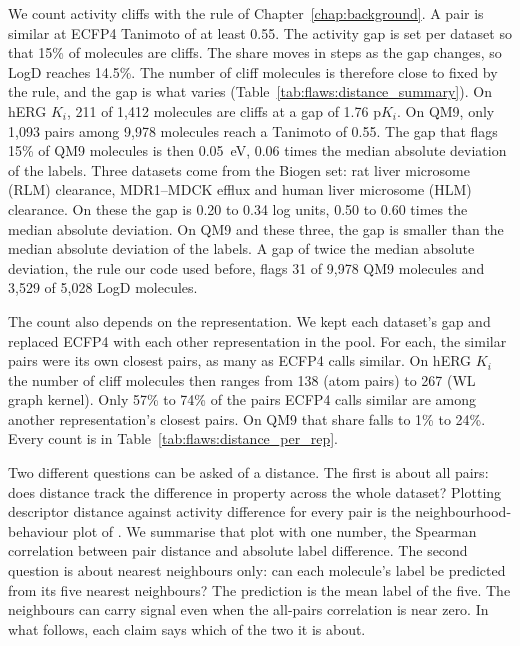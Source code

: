 We count activity cliffs with the rule of Chapter~\ref{chap:background}. A pair is similar at ECFP4 Tanimoto of at least 0.55. The activity gap is set per dataset so that 15\% of molecules are cliffs. The share moves in steps as the gap changes, so LogD reaches 14.5\%. The number of cliff molecules is therefore close to fixed by the rule, and the gap is what varies (Table~\ref{tab:flaws:distance_summary}). On hERG $K_i$, 211 of 1,412 molecules are cliffs at a gap of 1.76 p$K_i$. On QM9, only 1,093 pairs among 9,978 molecules reach a Tanimoto of 0.55. The gap that flags 15\% of QM9 molecules is then 0.05~eV, 0.06 times the median absolute deviation of the labels. Three datasets come from the Biogen set: rat liver microsome (RLM) clearance, MDR1--MDCK efflux and human liver microsome (HLM) clearance. On these the gap is 0.20 to 0.34 log units, 0.50 to 0.60 times the median absolute deviation. On QM9 and these three, the gap is smaller than the median absolute deviation of the labels. A gap of twice the median absolute deviation, the rule our code used before, flags 31 of 9,978 QM9 molecules and 3,529 of 5,028 LogD molecules.

The count also depends on the representation. We kept each dataset's gap and replaced ECFP4 with each other representation in the pool. For each, the similar pairs were its own closest pairs, as many as ECFP4 calls similar. On hERG $K_i$ the number of cliff molecules then ranges from 138 (atom pairs) to 267 (WL graph kernel). Only 57\% to 74\% of the pairs ECFP4 calls similar are among another representation's closest pairs. On QM9 that share falls to 1\% to 24\%. Every count is in Table~\ref{tab:flaws:distance_per_rep}.

Two different questions can be asked of a distance. The first is about all pairs: does distance track the difference in property across the whole dataset? Plotting descriptor distance against activity difference for every pair is the neighbourhood-behaviour plot of \citet{Patterson1996}. We summarise that plot with one number, the Spearman correlation between pair distance and absolute label difference. The second question is about nearest neighbours only: can each molecule's label be predicted from its five nearest neighbours? The prediction is the mean label of the five. The neighbours can carry signal even when the all-pairs correlation is near zero. In what follows, each claim says which of the two it is about.

